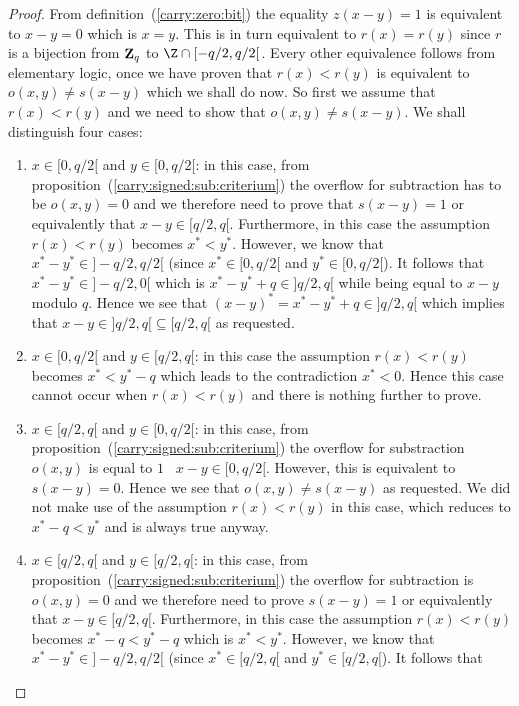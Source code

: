 \documentclass{article}
\newcommand{\zq}{\mbox{${\bf Z}_{q}$}}
\begin{document}
\begin{proof}
  From definition~(\ref{carry:zero:bit}) the equality $z(x-y)=1$ is equivalent
  to $x-y=0$ which is $x=y$. This is in turn equivalent to $r(x)=r(y)$ since
  $r$ is a bijection from $\zq$ to $\Z\cap[-q/2,q/2[$. Every other equivalence
  follows from elementary logic, once we have proven that $r(x)<r(y)$ is
  equivalent to $o(x,y)\neq s(x-y)$ which we shall do now. So first we 
  assume that $r(x)<r(y)$ and we need to show that $o(x,y)\neq s(x-y)$.
  We shall distinguish four cases:
  \begin{enumerate}
    \item $x\in[0,q/2[$ and $y\in[0,q/2[$: in this case, from 
      proposition~(\ref{carry:signed:sub:criterium}) the overflow for
      subtraction has to be $o(x,y)=0$ and we therefore need to prove
      that $s(x-y)=1$ or equivalently that $x-y\in[q/2,q[$. Furthermore,
      in this case the assumption $r(x)<r(y)$ becomes $x^{*}<y^{*}$.
      However, we know that $x^{*}-y^{*}\in]-q/2,q/2[$ (since 
      $x^{*}\in[0,q/2[$ and $y^{*}\in[0,q/2[$). It follows that
      $x^{*}-y^{*}\in]-q/2,0[$ which is $x^{*}-y^{*}+q\in]q/2,q[$
      while being equal to $x-y$ modulo $q$. Hence we see that
      $(x-y)^{*}=x^{*}-y^{*}+q\in]q/2,q[$ which implies that
      $x-y\in]q/2,q[\subseteq[q/2,q[$ as requested.
    \item $x\in[0,q/2[$ and $y\in[q/2,q[$: in this case the assumption 
      $r(x)<r(y)$ becomes $x^{*}<y^{*}-q$ which leads to the
      contradiction $x^{*}<0$. Hence this case cannot occur 
      when $r(x)<r(y)$ and there is nothing further to prove.
    \item $x\in[q/2,q[$ and $y\in[0,q/2[$: in this case, from
      proposition~(\ref{carry:signed:sub:criterium}) the overflow
      for substraction $o(x,y)$ is equal to $1$ \ifand\ $x-y\in[0,q/2[$.
      However, this is equivalent to $s(x-y)=0$. Hence we see that
      $o(x,y)\neq s(x-y)$ as requested. We did not make use of the 
      assumption $r(x)<r(y)$ in this case, which reduces to 
      $x^{*}-q < y^{*}$ and is always true anyway. 
    \item $x\in[q/2,q[$ and $y\in[q/2,q[$: in this case, from
      proposition~(\ref{carry:signed:sub:criterium}) the overflow for 
      subtraction is $o(x,y)=0$ and we therefore need to prove 
      $s(x-y)=1$ or equivalently that $x-y\in[q/2,q[$. Furthermore,
      in this case the assumption $r(x)<r(y)$ becomes $x^{*}-q<y^{*}-q$
      which is $x^{*}<y^{*}$. However, we know that $x^{*}-y^{*}\in]-q/2,q/2[$
      (since $x^{*}\in[q/2,q[$ and $y^{*}\in[q/2,q[$). It follows that

\end{enumerate}
\end{proof}
\end{document}
